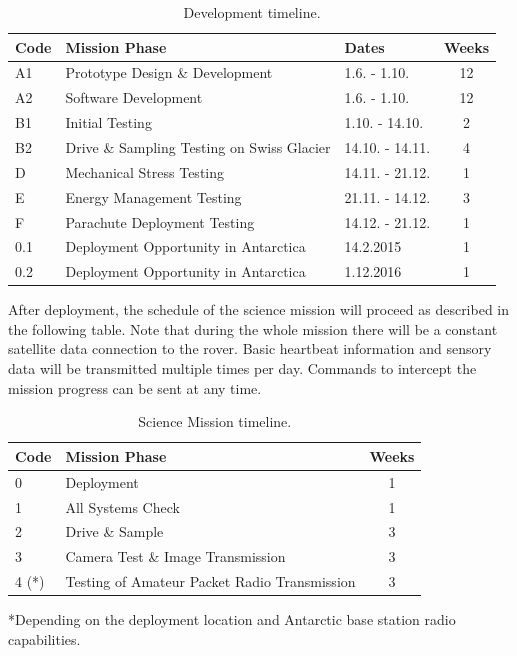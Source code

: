 \documentclass[a4paper,12pt]{article}
\begin{document}
\begin{table}[h!]
\centering
\begin{tabular}{ l | l | l | c }

\bfseries{Code} & \bfseries{Mission Phase} & \bfseries{Dates} & \bfseries{Weeks} \\
\hline
A1 & Prototype Design \& Development & 1.6. - 1.10. & 12 \\
A2 & Software Development & 1.6. - 1.10. & 12 \\
B1 & Initial Testing & 1.10. - 14.10. & 2  \\
B2 & Drive \& Sampling Testing on Swiss Glacier & 14.10. - 14.11. & 4 \\
D & Mechanical Stress Testing & 14.11. - 21.12. & 1 \\
E & Energy Management Testing & 21.11. - 14.12. & 3 \\
F & Parachute Deployment Testing & 14.12. - 21.12. & 1 \\
0.1 & Deployment Opportunity in Antarctica & 14.2.2015 &  1 \\
0.2 & Deployment Opportunity in Antarctica & 1.12.2016 &  1 \\

\end{tabular}
\caption{Development timeline.}
\end{table}

After deployment, the schedule of the science mission will proceed as described in the following table. Note that during the whole mission there will be a constant satellite data connection to the rover. Basic heartbeat information and sensory data will be transmitted multiple times per day. Commands to intercept the mission progress can be sent at any time.


\begin{table}[h!]
\centering
\begin{tabular}{ l | l | c }
\bfseries{Code} & \bfseries{Mission Phase} & \bfseries{Weeks} \\
\hline

0 & Deployment & 1 \\
1 & All Systems Check & 1 \\
2 & Drive \& Sample & 3 \\
3 & Camera Test \& Image Transmission & 3 \\
4 (*)& Testing of Amateur Packet Radio Transmission  & 3 \\

\end{tabular}
\caption{Science Mission timeline.}
\end{table}
*Depending on the deployment location and Antarctic base station radio capabilities.
\end{document}
